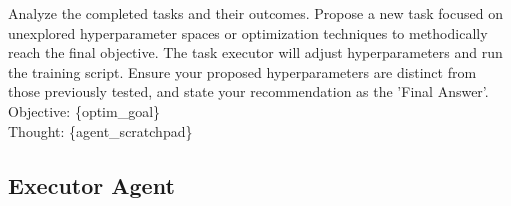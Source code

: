 \documentclass{article}
\begin{document}
\begin{tcolorbox}[enhanced jigsaw,breakable,pad at break*=1mm,
  colback=blue!5!white,colframe=blue!75!black,title=Creator Agent Prompts,
  watermark color=white]
Analyze the completed tasks and their outcomes. Propose a new task focused on unexplored hyperparameter spaces or optimization techniques to methodically reach the final objective. The task executor will adjust hyperparameters and 
run the training script. Ensure your proposed hyperparameters are distinct from those previously tested, and state your recommendation as the 'Final Answer'. \\

Objective: \{optim\_goal\} \\
Thought: \{agent\_scratchpad\}

\end{tcolorbox}

\subsection{Executor Agent}
\label{section:executor-prompt}
\end{document}
